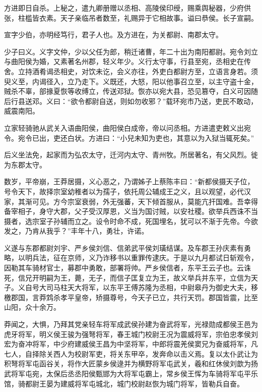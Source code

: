 \documentclass[12pt,UTF8]{ctexbook}
\begin{document}
方进即日自杀。上秘之，遣九卿册赠以丞相、高陵侯印绶，赐乘舆秘器，少府供张，柱槛皆衣素。天子亲临吊者数至，礼赐异于它相故事。谥曰恭侯。长子宣嗣。



宣字少伯，亦明经笃行，君子人也。及方进在，为关都尉、南郡太守。



少子曰义。义字文仲，少以父任为郎，稍迁诸曹，年二十出为南阳都尉。宛令刘立与曲阳侯为婚，又素著名州郡，轻义年少。义行太守事，行县至宛，丞相史在传舍。立持酒肴谒丞相史，对饮未讫，会义亦往，外吏白都尉方至，立语言身若。须臾义至，内谒径入，立乃走下。义既还，大怒，阳以他事召立至，以主守盗十金，贼杀不辜，部掾夏恢等收缚立，传送邓狱。恢亦以宛大县，恐见篡夺，白义可因随后行县送邓。义曰：“欲令都尉自送，则如勿收邪？”载环宛市乃送，吏民不敢动，威震南阳。



立家轻骑驰从武关入语曲阳侯，曲阳侯白成帝，帝以问丞相。方进遣吏敕义出宛令。宛令已出，吏还白状。方进曰：“小兒未知为吏也，其意以为入狱当辄死矣。”



后义坐法免，起家而为弘农太守，迁河内太守、青州牧。所居著名，有父风烈。徙为东郡太守。



数岁，平帝崩，王莽居摄，义心恶之，乃谓姊子上蔡陈丰曰：“新都侯摄天子位，号令天下，故择宗室幼稚者以为孺子，依托周公辅成王之义，且以观望，必代汉家，其渐可见。方今宗室衰弱，外无强蕃，天下倾首服从，莫能亢扞国难。吾幸得备宰相子，身守大郡，父子受汉厚恩，义当为国讨贼，以安社稷。欲举兵西诛不当摄者，选宗室子孙辅而立之。设令时命不成，死国埋名，犹可以不渐于先帝。今欲发之，乃肯从我乎？”丰年十八，勇壮，许诺。



义遂与东郡都尉刘宇、严乡侯刘信、信弟武平侯刘璜结谋。及车郡王孙庆素有勇略，以明兵法，征在京师，义乃诈移书以重罪传逮庆。于是以九月都试日斩观令，因勒其车骑材官士，募郡中勇敢，部署将帅。严乡侯信者，东平王云子也。云诛死，信兄开明嗣为王，薨，无子，而信子匡复立为王，故义举兵并东平，立信为天子。义自号大司马柱天大将军，以东平王傅苏隆为丞相，中尉皋丹为御史大夫，移檄郡国，言莽鸩杀孝平皇帝，矫摄尊号，今天子已立，共行天罚。郡国皆震，比至山阳，众十余万。



莽闻之，大惧，乃拜其党亲轻车将军成武侯孙建为奋武将军，光禄勋成都侯王邑为虎牙将军，明义侯王骏为强弩将军，春王城门校尉王况为震威将军，宗伯忠孝侯刘宏为奋冲将军，中少府建威侯王昌为中坚将军，中郎将震羌侯窦兄为奋威将军，凡七人，自择除关西人为校尉军吏，将关东甲卒，发奔命以击义焉。复以太仆武让为积弩将军屯函谷关，将作大匠蒙乡侯逯并为横野将军屯武关，羲和红休侯刘歆为扬武将军屯宛，太保后丞丞阳侯甄邯为大将军屯霸上，常乡侯王恽为车骑将军屯平乐馆，骑都尉王晏为建威将军屯城北，城门校尉赵恢为城门将军，皆勒兵自奋。
\end{document}
